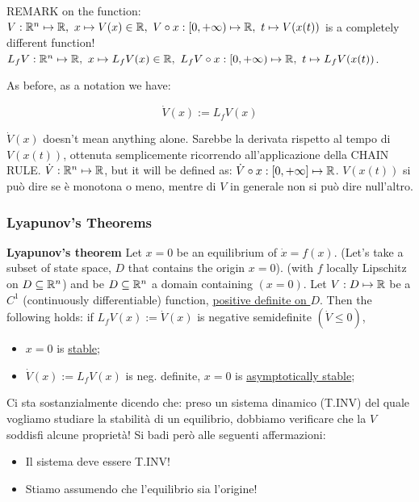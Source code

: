REMARK on the function: $V: \mathbb{R}^n \mapsto \mathbb{R},\ x \mapsto V(x) \in \mathbb{R},\ V \circ x :[0,+\infty) \mapsto \mathbb{R},\ t \mapsto V(x(t))$ is a completely different function! $L_fV:\R^n \mapsto \R,\ x \mapsto L_fV(x) \in \R,\ L_fV \circ x :[0,+\infty) \mapsto \R, \ t \mapsto L_fV(x(t))$.

As before, as a notation we have:

\[
	\dot{V}(x) := L_fV(x)
\]

$\dot{V}(x)$ doesn't mean anything alone. Sarebbe la derivata rispetto al tempo di $V(x(t))$, ottenuta semplicemente ricorrendo all'applicazione della CHAIN RULE. $\dot{V}:\mathbb{R}^n \mapsto \mathbb{R}$, but it will be defined as: $\dot{V} \circ x:[0,+\infty] \mapsto \mathbb{R}$. $V(x(t))$ si può dire se è monotona o meno, mentre di $V$ in generale non si può dire null'altro.

\subsubsection{Lyapunov's Theorems}

\begin{defn}{\textbf{Lyapunov's theorem}} \newline
Let $x=0$ be an equilibrium of $\dot{x}=f(x)$. (Let's take a subset of state space, $D$ that contains the origin $x=0$). (with $f$ locally Lipschitz on $D \subseteq \mathbb{R}^n$) and be $D \subseteq \mathbb{R}^n$ a domain containing $(x=0)$.
Let $V:D\mapsto \mathbb{R}$ be a $C^1$ (continuously differentiable) function, \underline{positive definite on $D$}. Then the following holds: if $L_fV(x) := \dot{V}(x)$ is negative semidefinite $(\dot{V} \leq 0)$,
\begin{itemize}
\item $x=0$ is \underline{stable};
\item $\dot{V}(x) := L_fV(x)$ is neg. definite, $x=0$ is \underline{asymptotically stable};
\end{itemize}
\end{defn}

Ci sta sostanzialmente dicendo che: preso un sistema dinamico (T.INV) del quale vogliamo studiare la stabilità di un equilibrio, dobbiamo verificare che la $V$ soddisfi alcune proprietà! Si badi però alle seguenti affermazioni:\begin{itemize}
\item Il sistema deve essere T.INV!
\item Stiamo assumendo che l'equilibrio sia l'origine!
\end{itemize}

